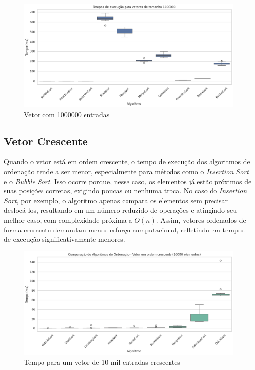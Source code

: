 \documentclass[
	article,			%
	11pt,				%
	oneside,			%
	a4paper,			%
	english,			%
	brazil,				%
	sumario=tradicional
	]{abntex2}
\begin{document}
\begin{figure}[h!]
    \centering
    \includegraphics[width=0.8\linewidth]{Tempo1000000.png}
    \caption{Vetor com 1000000 entradas}
    \label{fig:placeholder}
\end{figure}

\subsection{Vetor Crescente}
Quando o vetor está em ordem crescente, o tempo de execução dos algoritmos de ordenação tende a ser menor, especialmente para métodos como o \textit{Insertion Sort} e o \textit{Bubble Sort}. Isso ocorre porque, nesse caso, os elementos já estão próximos de suas posições corretas, exigindo poucas ou nenhuma troca. No caso do \textit{Insertion Sort}, por exemplo, o algoritmo apenas compara os elementos sem precisar deslocá-los, resultando em um número reduzido de operações e atingindo seu melhor caso, com complexidade próxima a $O(n)$. Assim, vetores ordenados de forma crescente demandam menos esforço computacional, refletindo em tempos de execução significativamente menores.


\begin{figure}[h!]
    \centering
    \includegraphics[width=1\linewidth]{Crescente.png}
    \caption{Tempo para um vetor de 10 mil entradas crescentes}
    \label{fig:placeholder}
\end{figure}
\end{document}
